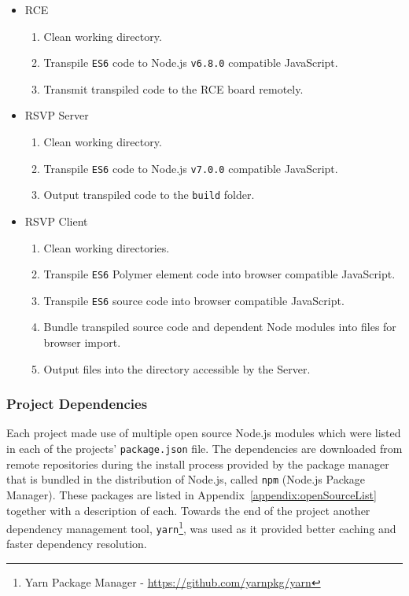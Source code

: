       \begin{itemize}
        \item RCE
        \begin{enumerate}
          \item Clean working directory.
          \item Transpile \texttt{ES6} code to Node.js \texttt{v6.8.0} compatible JavaScript.
          \item Transmit transpiled code to the RCE board remotely.
        \end{enumerate}
        \item RSVP Server
        \begin{enumerate}
          \item Clean working directory.
          \item Transpile \texttt{ES6} code to Node.js \texttt{v7.0.0} compatible JavaScript.
          \item Output transpiled code to the \texttt{build} folder.
        \end{enumerate}
        \item RSVP Client
        \begin{enumerate}
          \item Clean working directories.
          \item Transpile \texttt{ES6} Polymer element code into browser compatible JavaScript.
          \item Transpile \texttt{ES6} source code into browser compatible JavaScript.
          \item Bundle transpiled source code and dependent Node modules into files for browser import.
          \item Output files into the directory accessible by the Server.
        \end{enumerate}
      \end{itemize}
      
    \subsubsection{Project Dependencies}
      Each project made use of multiple open source Node.js modules which were listed in each of the projects' \texttt{package.json} file. The dependencies are downloaded from remote repositories during the install process provided by the package manager that is bundled in the distribution of Node.js, called \texttt{npm} (Node.js Package Manager). These packages are listed in Appendix~\ref{appendix:openSourceList} together with a description of each. Towards the end of the project another dependency management tool, \texttt{yarn}\footnote{Yarn Package Manager - \url{https://github.com/yarnpkg/yarn}}, was used as it provided better caching and faster dependency resolution.
      
